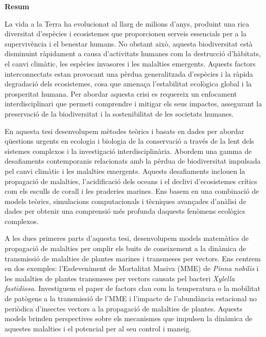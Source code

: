 \pagebreak
\thispagestyle{empty}

\begin{center}
    \textbf{\Large Resum}
\end{center}

La vida a la Terra ha evolucionat al llarg de milions d'anys,
produint una rica diversitat d'espècies i ecosistemes que proporcionen serveis
essencials per a la supervivència i el benestar humans. No obstant això,
aquesta biodiversitat està disminuint ràpidament a causa d'activitats humanes
com la destrucció d'hàbitats, el canvi climàtic, les espècies invasores i les
malalties emergents. Aquests factors interconnectats estan provocant una pèrdua
generalitzada d'espècies i la ràpida degradació dels ecosistemes, cosa que
amenaça l'estabilitat ecològica global i la prosperitat humana. Per abordar
aquesta crisi es requereix un enfocament interdisciplinari que permeti
comprendre i mitigar els seus impactes, assegurant la preservació de la
biodiversitat i la sostenibilitat de les societats humanes.

En aquesta tesi desenvolupem mètodes teòrics i basats en dades per abordar
qüestions urgents en ecologia i biologia de la conservació a través de la
lent dels sistemes complexos i la investigació interdisciplinària.
Abordem una gamma de desafiaments contemporanis relacionats amb la pèrdua de
biodiversitat impulsada pel canvi climàtic i les malalties emergents.
Aquests desafiaments inclouen la propagació de malalties, l'acidificació dels
oceans i el declivi d'ecosistemes crítics com els esculls de corall i les
praderies marines. Ens basem en una combinació de models teòrics,
simulacions computacionals i tècniques avançades d'anàlisi de dades per
obtenir una comprensió més profunda daquests fenòmens ecològics complexos.

A les dues primeres parts d'aquesta tesi, desenvolupem models matemàtics de
propagació de malalties per omplir els buits de coneixement a la
dinàmica de transmissió de malalties de plantes marines i transmeses per
vectors. Ens centrem en dos exemples: l'Esdeveniment de Mortalitat Masiva (MME)
de \textit{Pinna nobilis} i les malalties de plantes transmeses per
vectors causats pel bacteri \textit{Xylella fastidiosa}. Investiguem
el paper de factors clau com la temperatura o la mobilitat de patògens a
la transmissió de l'MME i l'impacte de l'abundància estacional no periòdica
d'insectes vectors a la propagació de malalties de plantes. Aquests
models brinden perspectives sobre els mecanismes que impulsen la dinàmica de
aquestes malalties i el potencial per al seu control i maneig.

